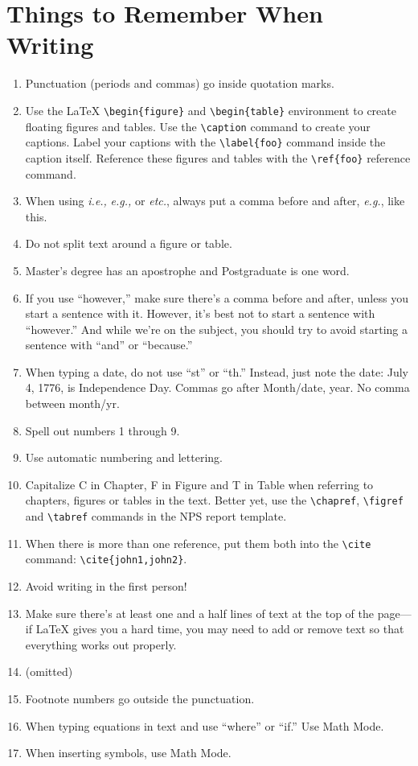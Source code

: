 \section{Things to Remember When Writing}\label{sec:remember}
\begin{enumerate}
\item Punctuation (periods and commas) go inside quotation marks. 
\item Use the \LaTeX{} \verb+\begin{figure}+ and \verb+\begin{table}+ environment to
  create floating figures and tables. Use the \verb+\caption+ command
  to create your captions. Label your captions with the
  \verb+\label{foo}+ command inside the caption itself. Reference
  these figures and tables with the \verb+\ref{foo}+ reference command.
\item When using \emph{i.e.,} \emph{e.g.,} or \emph{etc.}, always put
  a comma before and after, \emph{e.g.}, like this.
\item Do not split text around a figure or table. 
\item Master's degree has an apostrophe and Postgraduate is one word. 
\item If you use ``however,'' make sure there's a comma before and after,
unless you 
start a sentence with it. However, it's best not to start a sentence
with ``however.'' And while we're on the subject, you should try to avoid starting a sentence with ``and'' or ``because.'' 
\item When typing a date, do not use ``st'' or ``th.'' Instead, just
  note the date: July 4, 1776, is Independence Day. Commas go 
after Month/date, year. No comma between month/yr. 
\item Spell out numbers 1 through 9. 
\item Use automatic numbering and lettering.
\item Capitalize C in Chapter, F in Figure and T in Table when referring
to chapters, 
figures or tables in the text. Better yet, use the \verb+\chapref+,
\verb+\figref+ and \verb+\tabref+ commands in the NPS report template.
\item When there is more than one reference, put them both into the \verb+\cite+ command: \verb+\cite{john1,john2}+.
\item Avoid writing in the first person!
\item Make sure there's at least one and a half lines of text at the
  top of the page---if \LaTeX{} gives you a hard time, you may need to
  add or remove text so that everything works out properly.
\item (omitted)
\item Footnote numbers go outside the punctuation. 
\item When typing equations in text and use ``where'' or ``if.'' Use
  Math Mode. 
\item When inserting symbols, use Math Mode.
\end{enumerate}
